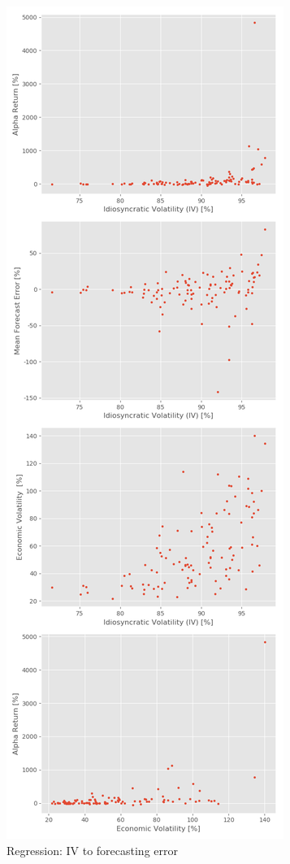\begin{figure}[h]
    \centering
    \includegraphics[height = 9 in , width = 5 in]{Plot/IndividualStockRegression.png}
    \caption{Regression: IV to forecasting error}
    \label{visualization}
\end{figure}






